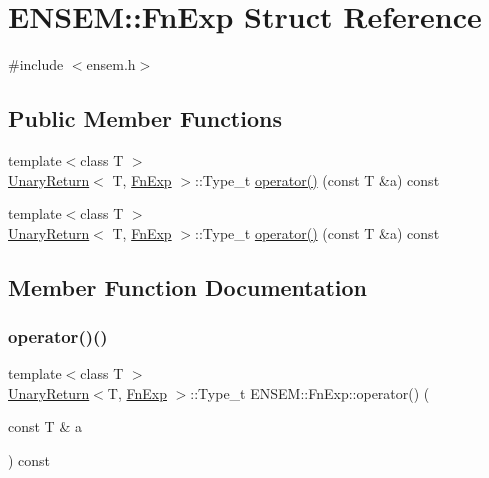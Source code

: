 \hypertarget{structENSEM_1_1FnExp}{}\section{E\+N\+S\+EM\+:\+:Fn\+Exp Struct Reference}
\label{structENSEM_1_1FnExp}


{\ttfamily \#include $<$ensem.\+h$>$}

\subsection*{Public Member Functions}
\begin{DoxyCompactItemize}
\item 
{\footnotesize template$<$class T $>$ }\\\mbox{\hyperlink{structENSEM_1_1UnaryReturn}{Unary\+Return}}$<$ T, \mbox{\hyperlink{structENSEM_1_1FnExp}{Fn\+Exp}} $>$\+::Type\+\_\+t \mbox{\hyperlink{structENSEM_1_1FnExp_a10f95f4422549fc30c1eacde6618fdcf}{operator()}} (const T \&a) const
\item 
{\footnotesize template$<$class T $>$ }\\\mbox{\hyperlink{structENSEM_1_1UnaryReturn}{Unary\+Return}}$<$ T, \mbox{\hyperlink{structENSEM_1_1FnExp}{Fn\+Exp}} $>$\+::Type\+\_\+t \mbox{\hyperlink{structENSEM_1_1FnExp_a10f95f4422549fc30c1eacde6618fdcf}{operator()}} (const T \&a) const
\end{DoxyCompactItemize}


\subsection{Member Function Documentation}
\mbox{\label{structENSEM_1_1FnExp_a10f95f4422549fc30c1eacde6618fdcf}} 
\subsubsection{\texorpdfstring{operator()()}{operator()()}\hspace{0.1cm}{\footnotesize\ttfamily [1/2]}}
{\footnotesize\ttfamily template$<$class T $>$ \\
\mbox{\hyperlink{structENSEM_1_1UnaryReturn}{Unary\+Return}}$<$T, \mbox{\hyperlink{structENSEM_1_1FnExp}{Fn\+Exp}} $>$\+::Type\+\_\+t E\+N\+S\+E\+M\+::\+Fn\+Exp\+::operator() (\begin{DoxyParamCaption}\item[{const T \&}]{a }\end{DoxyParamCaption}) const\hspace{0.3cm}{\ttfamily [inline]}}

